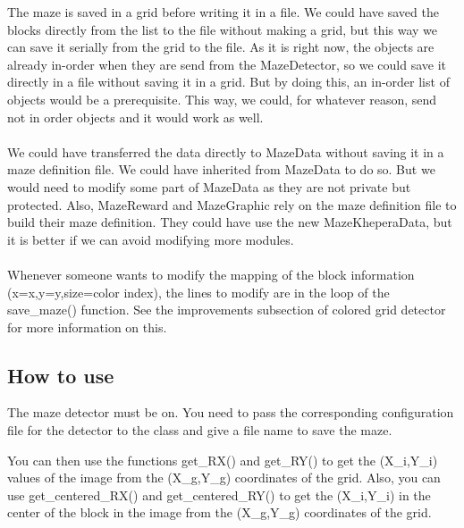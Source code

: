 The maze is saved in a grid before writing it in a file. We could have 
saved the blocks directly from the list to the file without making a 
grid, but this way we can save it serially from the grid to the file. 
As it is right now, the objects are already in-order when they are 
send from the MazeDetector, so we could save it directly in a file 
without saving it in a grid. But by doing this, an in-order list of 
objects would be a prerequisite. This way, we could, for whatever 
reason, send not in order objects and it would work as well. 
\\
\\
We could have transferred the data directly to MazeData without saving 
it in a maze definition file. We could have inherited from MazeData 
to do so. But we would need to modify some part of MazeData as they 
are not private but protected. Also, MazeReward and MazeGraphic rely 
on the maze definition file to build their maze definition. They could 
have use the new MazeKheperaData, but it is better if we can avoid 
modifying more modules.
\\
\\
Whenever someone wants to modify the mapping of the block information 
(x=x,y=y,size=color index), the lines to modify are in the loop of 
the save\_maze() function. See the improvements subsection of colored 
grid detector for more information on this.

\subsection{How to use}
\label{sec:mkd:howto}

The maze detector must be on. You need to pass the corresponding 
configuration file for the detector to the class and give a file name 
to save the maze. 

You can then use the functions get\_RX() and get\_RY() to get the (X\_i,Y\_i) 
values of the image from the (X\_g,Y\_g) coordinates of the grid. Also, 
you can use get\_centered\_RX() and get\_centered\_RY() to get the (X\_i,Y\_i) 
in the center of the block in the image from the (X\_g,Y\_g) coordinates 
of the grid.
